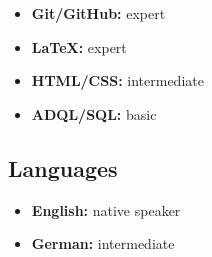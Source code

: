 \documentclass[12pt, letterpaper]{hunt-cv}
\begin{document}
\begin{itemize}
    \item \textbf{Git/GitHub:} expert
    \item \textbf{LaTeX:} expert
    \item \textbf{HTML/CSS:} intermediate
    \item \textbf{ADQL/SQL:} basic
\end{itemize}

\subsection*{Languages}

\begin{itemize}
    \item \textbf{English:} native speaker
    \item \textbf{German:} intermediate
\end{itemize}
\end{document}
